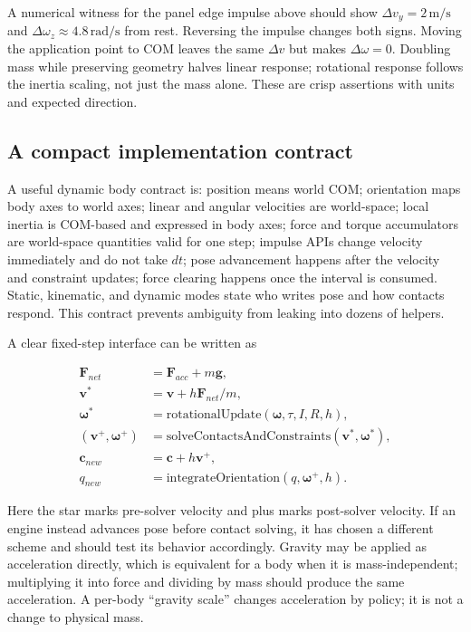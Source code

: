A numerical witness for the panel edge impulse above should show \(\Delta v_y=2\,\mathrm{m/s}\) and \(\Delta\omega_z\approx4.8\,\mathrm{rad/s}\) from rest. Reversing the impulse changes both signs. Moving the application point to COM leaves the same \(\Delta v\) but makes \(\Delta\omega=0\). Doubling mass while preserving geometry halves linear response; rotational response follows the inertia scaling, not just the mass alone. These are crisp assertions with units and expected direction.

\subsection{A compact implementation contract}\label{06-engine-ii-ch034-a-compact-implementation-contract}

\hypertarget{06-engine-ii-ch034-a-compact-implementation-contract}{}

A useful dynamic body contract is: position means world COM; orientation maps body axes to world axes; linear and angular velocities are world-space; local inertia is COM-based and expressed in body axes; force and torque accumulators are world-space quantities valid for one step; impulse APIs change velocity immediately and do not take \(dt\); pose advancement happens after the velocity and constraint updates; force clearing happens once the interval is consumed. Static, kinematic, and dynamic modes state who writes pose and how contacts respond. This contract prevents ambiguity from leaking into dozens of helpers.

A clear fixed-step interface can be written as

\[
\begin{aligned}
\mathbf F_{net}&=\mathbf F_{acc}+m\mathbf g,\\
\mathbf v^*&=\mathbf v+h\mathbf F_{net}/m,\\
\boldsymbol\omega^*&=\text{rotationalUpdate}(\boldsymbol\omega,\tau,I,R,h),\\
(\mathbf v^+,\boldsymbol\omega^+)&=\text{solveContactsAndConstraints}(\mathbf v^*,\boldsymbol\omega^*),\\
\mathbf c_{new}&=\mathbf c+h\mathbf v^+,\\
q_{new}&=\text{integrateOrientation}(q,\boldsymbol\omega^+,h).
\end{aligned}
\]

Here the star marks pre-solver velocity and plus marks post-solver velocity. If an engine instead advances pose before contact solving, it has chosen a different scheme and should test its behavior accordingly. Gravity may be applied as acceleration directly, which is equivalent for a body when it is mass-independent; multiplying it into force and dividing by mass should produce the same acceleration. A per-body ``gravity scale'' changes acceleration by policy; it is not a change to physical mass.

